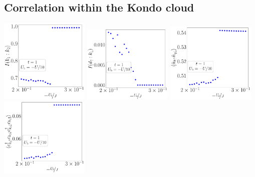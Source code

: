 \subsection*{Correlation within the Kondo cloud}
\begin{center}
	\includegraphics[width=0.32\textwidth]{../figures/corr-k-D=1000.00000,t=1.00000,J=30.00000,V=1.50000J,Ub=-Uby10,N=4,U=59.85787,93.55363,25.pdf}
	\includegraphics[width=0.32\textwidth]{../figures/mi-dk-D=1000.00000,t=1.00000,J=30.00000,V=1.50000J,Ub=-Uby10,N=4,U=59.85787,93.55363,25.pdf}
	\includegraphics[width=0.32\textwidth]{../figures/corr-k-diag-D=1000.00000,t=1.00000,J=30.00000,V=1.50000J,Ub=-Uby10,N=4,U=59.85787,93.55363,25.pdf}
	\includegraphics[width=0.32\textwidth]{../figures/corr-k-od-D=1000.00000,t=1.00000,J=30.00000,V=1.50000J,Ub=-Uby10,N=4,U=59.85787,93.55363,25.pdf}
\end{center}

